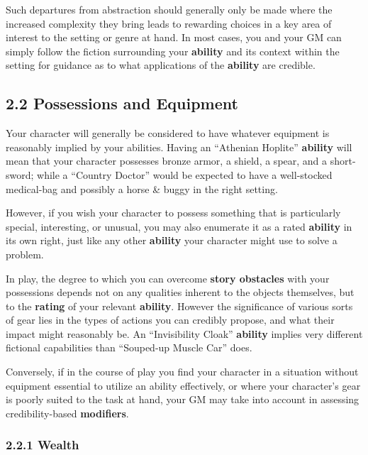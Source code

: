 \documentclass[
]{article}
\begin{document}
Such departures from abstraction should generally only be made where the
increased complexity they bring leads to rewarding choices in a key area
of interest to the setting or genre at hand. In most cases, you and your
GM can simply follow the fiction surrounding your \textbf{ability} and
its context within the setting for guidance as to what applications of
the \textbf{ability} are credible.

\hypertarget{possessions-and-equipment}{%
\subsection{2.2 Possessions and
Equipment}\label{possessions-and-equipment}}

Your character will generally be considered to have whatever equipment
is reasonably implied by your abilities. Having an ``Athenian Hoplite''
\textbf{ability} will mean that your character possesses bronze armor, a
shield, a spear, and a short-sword; while a ``Country Doctor'' would be
expected to have a well-stocked medical-bag and possibly a horse \&
buggy in the right setting.

However, if you wish your character to possess something that is
particularly special, interesting, or unusual, you may also enumerate it
as a rated \textbf{ability} in its own right, just like any other
\textbf{ability} your character might use to solve a problem.

In play, the degree to which you can overcome \textbf{story obstacles}
with your possessions depends not on any qualities inherent to the
objects themselves, but to the \textbf{rating} of your relevant
\textbf{ability}. However the significance of various sorts of gear lies
in the types of actions you can credibly propose, and what their impact
might reasonably be. An ``Invisibility Cloak'' \textbf{ability} implies
very different fictional capabilities than ``Souped-up Muscle Car''
does.

Conversely, if in the course of play you find your character in a
situation without equipment essential to utilize an ability effectively,
or where your character's gear is poorly suited to the task at hand,
your GM may take into account in assessing credibility-based
\textbf{modifiers}.

\hypertarget{wealth}{%
\subsubsection{2.2.1 Wealth}\label{wealth}}
\end{document}
